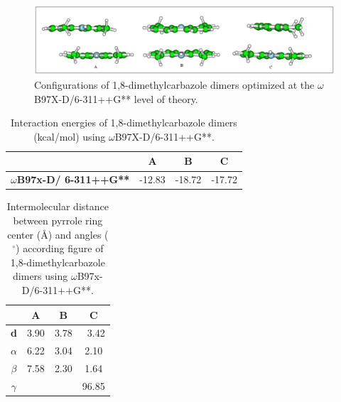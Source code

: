 	
	\begin{figure}[H]
		\centering
		\includegraphics[scale=0.9]{image/18-N}
		\caption{Configurations of 1,8-dimethylcarbazole dimers optimized at the $\omega$B97X-D/6-311++G** level of theory.}
	\end{figure}
	
	\begin{table}[H]
		\caption{Interaction energies of 1,8-dimethylcarbazole dimers (kcal/mol) using $\omega$B97X-D/6-311++G**.}
		\begin{center}
			\begin{tabular}{c c c c}
				\hline
				& \textbf{A} & \textbf{B} & \textbf{C} \\ \hline
				\textbf{$\omega$B97x-D/
					6-311++G**} & -12.83 & -18.72 & -17.72  \\ \hline
			\end{tabular}
		\end{center}
		\label{}
	\end{table}	
	
	
	\begin{table}[H]
		\caption{Intermolecular distance between pyrrole ring center (Å) and angles ($^{\circ}$) according figure  of  1,8-dimethylcarbazole dimers using $\omega$B97x-D/6-311++G**.}
		\begin{center}
			\begin{tabular}{c c c c}
				\hline
				& \multicolumn{1}{c}{\textbf{A}} & \multicolumn{1}{c}{\textbf{B}} & \multicolumn{1}{c}{\textbf{C}} \\ \hline
				\textbf{d} & \multicolumn{1}{r}{3.90} & \multicolumn{1}{r}{3.78} & \multicolumn{1}{r}{3.42} \\ 
				\textbf{$\alpha$}& 6.22 &3.04 & 2.10 \\ 
				\textbf{$\beta$} &7.58 & 2.30 & 1.64\\ 
				\textbf{$\gamma$} & &  & 96.85\\ \hline
			\end{tabular}
		\end{center}
		\label{}
	\end{table}		
	
